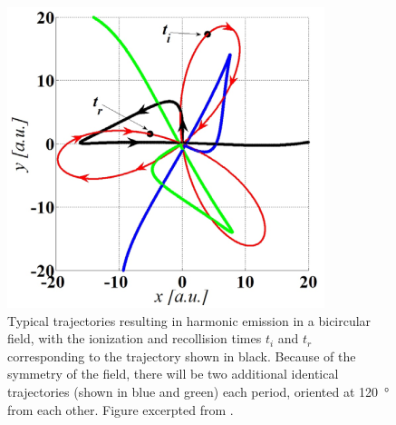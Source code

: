 
\begin{figure}[h!]
  
  \vspace{10mm}
  
  \centering
  \includegraphics[scale=0.8]{8-Spin-HHG/Figures/figure8D.png}
  \caption[
  Typical trajectories that result in HHG emission from bicircular fields, as calculated by A. Fleischer~et~al.
  ]{
  Typical trajectories resulting in harmonic emission in a bicircular field, with the ionization and recollision times $t_i$ and $t_r$ corresponding to the trajectory shown in black. Because of the symmetry of the field, there will be two additional identical trajectories (shown in blue and green) each period, oriented at \SI{120}{\degree} from each other.
  Figure excerpted from .
  }
  \label{f8-fleischer-trajectories}
  
  \vspace{15mm}
  

\end{figure}

